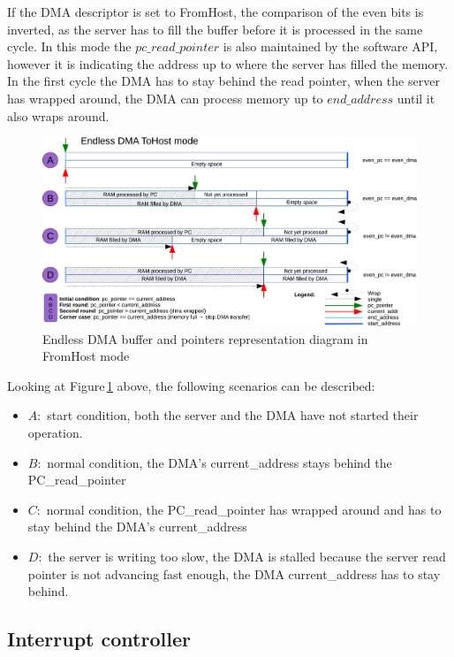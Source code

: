 \newpage
If the DMA descriptor is set to FromHost, the comparison of the even bits is inverted, as the server has to fill the buffer before it is processed in the same cycle. In this mode the $pc\_read\_pointer$ is also maintained by the software API, however it is indicating the address up to where the server has filled the memory. In the first cycle the DMA has to stay behind the read pointer, when the server has wrapped around, the DMA can process memory up to $end\_address$ until it also wraps around.

\begin{figure}[H]
	\centering
	\includegraphics[width=1\textwidth, page=2]{figures/Endless_DMA_diagram.pdf}
	\caption{Endless DMA buffer and pointers representation diagram in FromHost mode}
	\label{fig:endless_dma_diagram_fromhost}
\end{figure}
Looking at Figure\,\ref{fig:endless_dma_diagram_fromhost} above, the following scenarios can be described:
\begin{itemize}
	\item $A:$ start condition, both the server and the DMA have not started their operation.
	\item $B:$ normal condition, the DMA's current\_address stays behind the PC\_read\_pointer 
	\item $C:$ normal condition, the PC\_read\_pointer has wrapped around and has to stay behind the DMA's current\_address 
	\item $D:$ the server is writing too slow, the DMA is stalled because the server read pointer is not advancing fast enough, the DMA current\_address has to stay behind.
\end{itemize}

\newpage
\subsection{Interrupt controller}
\label{sec:interrupt_controller}

